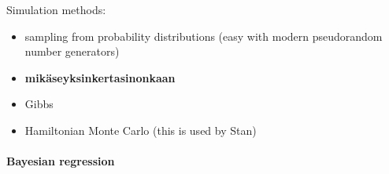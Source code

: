 Simulation methods:
\begin{itemize}
\tightlist
  \item
  sampling from probability distributions (easy with modern pseudorandom
  number generators)
  \item
  \textbf{mikäseyksinkertasinonkaan}
  \item
  Gibbs
  \item
  Hamiltonian Monte Carlo (this is used by Stan)
\end{itemize}


\paragraph{Bayesian regression}\label{bayesian-regression}

